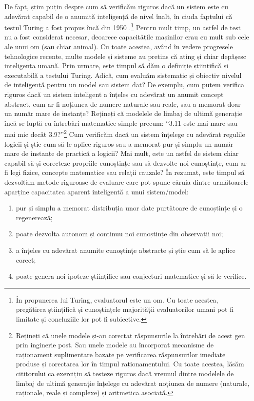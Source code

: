 \documentclass[../../book-main_ro.tex]{subfiles}
\begin{document}
De fapt, știm puțin despre cum să verificăm riguros dacă un sistem este cu adevărat capabil de o anumită inteligență de nivel înalt, în ciuda faptului că testul Turing a fost propus încă din 1950 \cite{Turing-1950}.\footnote{În propunerea lui Turing, evaluatorul este un om. Cu toate acestea, pregătirea științifică și cunoștințele majorității evaluatorilor umani pot fi limitate și concluziile lor pot fi subiective.} Pentru mult timp, un astfel de test nu a fost considerat necesar, deoarece capacitățile mașinilor erau cu mult sub cele ale unui om (sau chiar animal). Cu toate acestea, având în vedere progresele tehnologice recente, multe modele și sisteme au pretins că ating și chiar depășesc inteligența umană. Prin urmare, este timpul să dăm o definiție științifică și executabilă a testului Turing. Adică, cum evaluăm sistematic și obiectiv nivelul de inteligență pentru un model sau sistem dat? De exemplu, cum putem verifica riguros dacă un sistem inteligent a înțeles cu adevărat un anumit concept abstract, cum ar fi noțiunea de numere naturale sau reale, sau a memorat doar un număr mare de instanțe? Rețineți că modelele de limbaj de ultimă generație încă se luptă cu întrebări matematice simple precum: ``3.11 este mai mare sau mai mic decât 3.9?''\footnote{Rețineți că unele modele și-au corectat răspunsurile la întrebări de acest gen prin inginerie post. Sau unele modele au încorporat mecanisme de raționament suplimentare bazate pe verificarea răspunsurilor imediate produse și corectarea lor în timpul raționamentului. Cu toate acestea, lăsăm cititorului ca exercițiu să testeze riguros dacă vreunul dintre modelele de limbaj de ultimă generație înțelege cu adevărat noțiunea de numere (naturale, raționale, reale și complexe) și aritmetica asociată.}
Cum verificăm dacă un sistem înțelege cu adevărat regulile logicii și știe cum să le aplice riguros sau a memorat pur și simplu un număr mare de instanțe de practică a logicii? Mai mult, este un astfel de sistem chiar capabil să-și corecteze propriile cunoștințe sau să dezvolte noi cunoștințe, cum ar fi legi fizice, concepte matematice sau relații cauzale? În rezumat, este timpul să dezvoltăm metode riguroase de evaluare care pot spune căruia dintre următoarele aparține capacitatea aparent inteligentă a unui sistem/model:
\begin{enumerate}
    \item pur și simplu a memorat distribuția unor date purtătoare de cunoștințe și o regenerează;
    \item poate dezvolta autonom și continuu noi cunoștințe din observații noi;
    \item a înțeles cu adevărat anumite cunoștințe abstracte și știe cum să le aplice corect;
    \item poate genera noi ipoteze științifice sau conjecturi matematice și să le verifice.
\end{enumerate}
\end{document}

